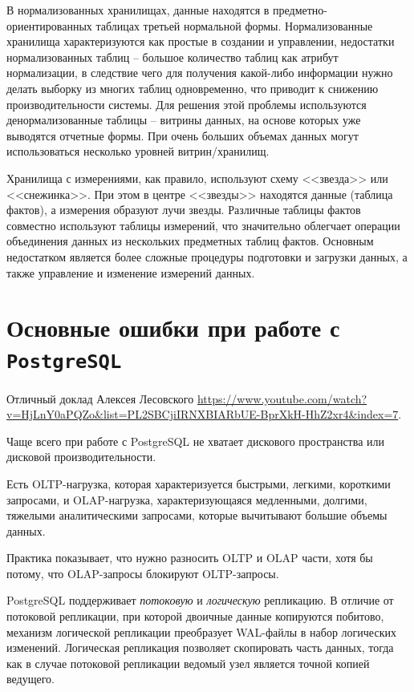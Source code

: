 \documentclass[%
	11pt,
	a4paper,
	utf8,
		]{article}
\begin{document}
В нормализованных хранилищах, данные находятся в предметно-ориентированных таблицах третьей нормальной формы. Нормализованные хранилища характеризуются как простые в создании и управлении, недостатки нормализованных таблиц -- большое количество таблиц как атрибут нормализации, в следствие чего для получения какой-либо информации нужно делать выборку из многих таблиц одновременно, что приводит к снижению производительности системы. Для решения этой проблемы используются денормализованные таблицы -- витрины данных, на основе которых уже выводятся отчетные формы. При очень больших объемах данных могут использоваться несколько уровней витрин/хранилищ.

Хранилища с измерениями, как правило, используют схему <<звезда>> или <<снежинка>>. При этом в центре <<звезды>> находятся данные (таблица фактов), а измерения образуют лучи звезды. Различные таблицы фактов совместно используют таблицы измерений, что значительно облегчает операции объединения данных из нескольких предметных таблиц фактов. Основным недостатком является более сложные процедуры подготовки и загрузки данных, а также управление и изменение измерений данных.

\section{Основные ошибки при работе с \texttt{PostgreSQL}}

Отличный доклад Алексея Лесовского \url{https://www.youtube.com/watch?v=HjLnY0aPQZo&list=PL2SBCjiIRNXBIARbUE-BprXkH-HhZ2xr4&index=7}.

Чаще всего при работе с PostgreSQL не хватает дискового пространства или дисковой производительности.

Есть OLTP-нагрузка, которая характеризуется быстрыми, легкими, короткими запросами, и OLAP-нагрузка, характеризующаяся медленными, долгими, тяжелыми аналитическими запросами, которые вычитывают большие объемы данных.

Практика показывает, что нужно разносить OLTP и OLAP части, хотя бы потому, что OLAP-запросы блокируют OLTP-запросы.

PostgreSQL поддерживает \emph{потоковую} и \emph{логическую} репликацию. В отличие от потоковой репликации, при которой двоичные данные копируются побитово, механизм логической репликации преобразует WAL-файлы в набор логических изменений. Логическая репликация позволяет скопировать часть данных, тогда как в случае потоковой репликации ведомый узел является точной копией ведущего. 
\end{document}
